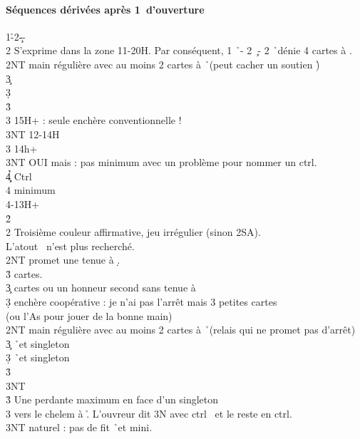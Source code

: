 \documentclass[a4paper]{article}
\begin{document}
\paragraph{Séquences dérivées après 1\pdfh\ d’ouverture}

\begin{bidtable}
1\h-2\c--\+\\
2\s \> S’exprime dans la zone 11-20H. Par conséquent, 1 \h\ - 2 \c\ - 2 \h\ dénie 4 cartes à \s .\+\\
2NT \> main régulière avec au moins 2 cartes à \h\ (peut cacher un soutien \h )\+\\
3\c {}\\
3\d {}\\
3\h {}\\
3\s {} 15H+ : seule enchère conventionnelle !\\
3NT  12-14H\-\\
3\s \> 14h+\+\\
3NT \> OUI mais : pas minimum avec un problème pour nommer un ctrl.\\
4\c\d\h \> Ctrl\\
4\s \> minimum\-\\
4\s {}-13H+\-\\
2\h\+\\
2\s \> Troisième couleur affirmative, jeu irrégulier (sinon 2SA).\\
\>L’atout \s\ n’est plus recherché.\+\\
2NT \> promet une tenue à \d .\\
3\h {} cartes.\\
3\c {} cartes ou un honneur second sans tenue à \d \\
3\d \> enchère coopérative : je n’ai pas l’arrêt mais 3 petites cartes\\
\>(ou l’As pour jouer de la bonne main)\-\\
2NT \> main régulière avec au moins 2 cartes à \h\ (relais qui ne promet pas d'arrêt)\+\\
3\c {} \h\ et singleton \c \\
3\d {} \h\ et singleton \d \\
3\h {}\\
3NT \-\-\\
3\h \> Une perdante maximum en face d'un singleton\+\\
3\s \> vers le chelem à \h . L'ouvreur dit 3N avec ctrl \s\ et le reste en ctrl.\\
3NT \> naturel : pas de fit \h\ et mini.\\

\end{bidtable}
\end{document}
